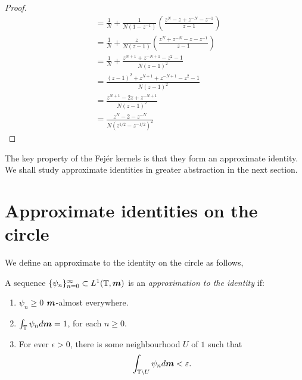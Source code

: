 \documentclass{owmaths}
\begin{document}
\begin{proof}
\begin{align*}
        &= \frac{1}{N} + \frac{1}{N(1-z^{-1})}\left( \frac{z^N - z + z^{-N} - z^{-1}}{z-1} \right)\\
        &= \frac{1}{N} + \frac{z}{N(z-1)}\left( \frac{z^N+z^{-N} - z - z^{-1}}{z-1} \right)\\
        &= \frac{1}{N} + \frac{z^{N+1} + z^{-N+1} - z^2 -1}{N(z-1)^2}\\
        &= \frac{(z-1)^2 + z^{N+1} + z^{-N+1} - z^2 - 1}{N(z-1)^2}\\
        &= \frac{z^{N+1}-2z+z^{-N+1}}{N(z-1)^2}\\
        &= \frac{z^{N}-2-z^{-N}}{N(z^{1/2}-z^{-1/2})^2}
    \end{align*}
\end{proof}

The key property of the Fej\'er kernels is that they form an approximate identity.
We shall study approximate identities in greater abstraction in the next section.

\section{Approximate identities on the circle}
We define an approximate to the identity on the circle as follows,
\begin{definition}
    A sequence $\{\psi_n\}_{n=0}^\infty \subset L^1(\mathbb{T},\boldsymbol{m})$ is an \emph{approximation to the identity}
    if:
    \begin{enumerate}
        \item{} $\psi_n \geq 0$ $\boldsymbol{m}$-almost everywhere.
        \item{} $\int_{\mathbb{T}} \psi_nd\boldsymbol{m} = 1$, for each $n \geq 0$.
        \item{} For ever $\epsilon > 0$, there is some neighbourhood
        $U$ of $1$ such that
        \begin{equation*}
            \int_{\mathbb{T}\setminus U} \psi_nd\boldsymbol{m} < \varepsilon.
        \end{equation*}
    \end{enumerate}
\end{definition}
\end{document}
